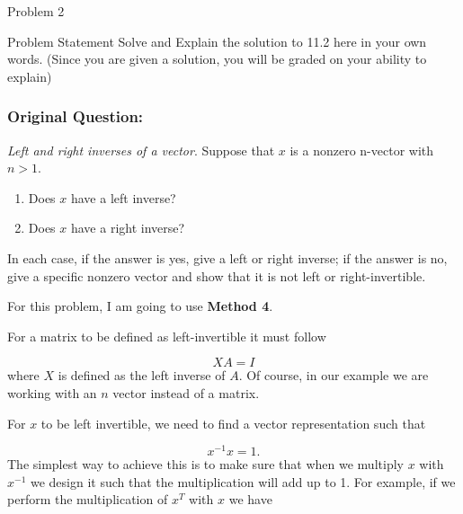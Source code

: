 \begin{problem}{Problem 2}
    \begin{statement}{Problem Statement}
        Solve and Explain the solution to 11.2 here in your own words. (Since you are given a solution, you will be graded on your ability to explain)

        \subsubsection*{Original Question:}

        \textit{Left and right inverses of a vector}. Suppose that $x$ is a nonzero n-vector with $n > 1$.

        \begin{enumerate}[label = (\alph*)]
            \item Does $x$ have a left inverse?
            \item Does $x$ have a right inverse?
        \end{enumerate}
        In each case, if the answer is yes, give a left or right inverse; if the answer is no, give a specific nonzero vector and show that it is not left or right-invertible.
    \end{statement}

    \begin{highlight}
        \noindent For this problem, I am going to use \textbf{Method 4}. \vspace*{1em}

        For a matrix to be defined as left-invertible it must follow 

        \setcounter{equation}{0}
        \begin{equation}
            XA = I
        \end{equation}
        where $X$ is defined as the left inverse of $A$. Of course, in our example we are working with an $n$ vector instead of a matrix. 

        For $x$ to be left invertible, we need to find a vector representation such that

        \begin{equation}
            x^{-1}x = 1.
        \end{equation}
        The simplest way to achieve this is to make sure that when we multiply $x$ with $x^{-1}$ we design it such that the multiplication will add up to 1. For example, if we perform the multiplication 
        of $x^{T}$ with $x$ we have


\end{highlight}
\end{problem}
